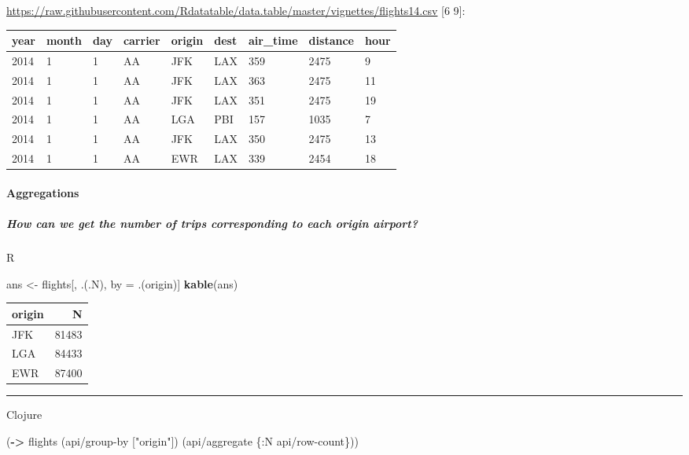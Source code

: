 \documentclass[]{article}
\newenvironment{Shaded}{\begin{snugshade}}{\end{snugshade}}
\newcommand{\KeywordTok}[1]{\textcolor[rgb]{0.13,0.29,0.53}{\textbf{#1}}}
\newcommand{\StringTok}[1]{\textcolor[rgb]{0.31,0.60,0.02}{#1}}
\newcommand{\AttributeTok}[1]{\textcolor[rgb]{0.77,0.63,0.00}{#1}}
\newcommand{\NormalTok}[1]{#1}
\let\oldparagraph\paragraph
\renewcommand{\paragraph}[1]{\oldparagraph{#1}\mbox{}}
\let\oldsubparagraph\subparagraph
\renewcommand{\subparagraph}[1]{\oldsubparagraph{#1}\mbox{}}
\begin{document}
\url{https://raw.githubusercontent.com/Rdatatable/data.table/master/vignettes/flights14.csv}
{[}6 9{]}:

\begin{longtable}[]{@{}lllllllll@{}}
\toprule
year & month & day & carrier & origin & dest & air\_time & distance &
hour\tabularnewline
\midrule
\endhead
2014 & 1 & 1 & AA & JFK & LAX & 359 & 2475 & 9\tabularnewline
2014 & 1 & 1 & AA & JFK & LAX & 363 & 2475 & 11\tabularnewline
2014 & 1 & 1 & AA & JFK & LAX & 351 & 2475 & 19\tabularnewline
2014 & 1 & 1 & AA & LGA & PBI & 157 & 1035 & 7\tabularnewline
2014 & 1 & 1 & AA & JFK & LAX & 350 & 2475 & 13\tabularnewline
2014 & 1 & 1 & AA & EWR & LAX & 339 & 2454 & 18\tabularnewline
\bottomrule
\end{longtable}

\paragraph{Aggregations}\label{aggregations}

\subparagraph{How can we get the number of trips corresponding to each
origin
airport?}\label{how-can-we-get-the-number-of-trips-corresponding-to-each-origin-airport}

R

\begin{Shaded}
\begin{Highlighting}[]
\NormalTok{ans <-}\StringTok{ }\NormalTok{flights[, .(.N), by =}\StringTok{ }\NormalTok{.(origin)]}
\KeywordTok{kable}\NormalTok{(ans)}
\end{Highlighting}
\end{Shaded}

\begin{longtable}[]{@{}lr@{}}
\toprule
origin & N\tabularnewline
\midrule
\endhead
JFK & 81483\tabularnewline
LGA & 84433\tabularnewline
EWR & 87400\tabularnewline
\bottomrule
\end{longtable}

\begin{center}\rule{0.5\linewidth}{0.5pt}\end{center}

Clojure

\begin{Shaded}
\begin{Highlighting}[]
\NormalTok{(}\KeywordTok{->}\NormalTok{ flights}
\NormalTok{    (api/group-by [}\StringTok{"origin"}\NormalTok{])}
\NormalTok{    (api/aggregate \{}\AttributeTok{:N}\NormalTok{ api/row-count\}))}
\end{Highlighting}
\end{Shaded}
\end{document}

